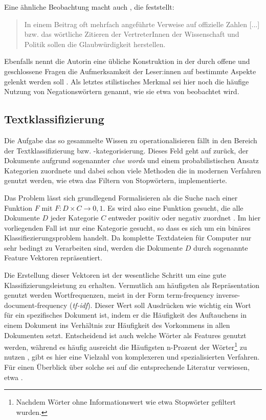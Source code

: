 Eine ähnliche Beobachtung macht auch \textcite{filatkina_2018}, die feststellt:

\begin{quotation}
    In einem Beitrag oft mehrfach angeführte Verweise auf offizielle Zahlen [...] bzw. das wörtliche Zitieren der VertreterInnen der Wissenschaft und Politik sollen die Glaubwürdigkeit herstellen. \parencite[][208]{filatkina_2018}
\end{quotation}

Ebenfalls nennt die Autorin eine übliche Konstruktion in der durch offene und geschlossene Fragen die Aufmerksamkeit der Leser:innen auf bestimmte Aspekte gelenkt werden soll \parencite[][205]{filatkina_2018}.
Als letztes stilistisches Merkmal sei hier noch die häufige Nutzung von Negationswörtern genannt, wie sie etwa von \textcite[149]{stumpf_2019} beobachtet wird.

\subsection{Textklassifizierung}

Die Aufgabe das so gesammelte Wissen zu operationalisieren fällt in den Bereich der Textklassifizierung bzw. -kategorisierung.
Dieses Feld geht auf \textcite{maron_1961} zurück, der Dokumente aufgrund sogenannter \textit{clue words} und einem probabilistischen Ansatz Kategorien zuordnete und dabei schon viele Methoden die in modernen Verfahren genutzt werden, wie etwa das Filtern von Stopwörtern, implementierte.

Das Problem lässt sich grundlegend Formalisieren als die Suche nach einer Funktion $F$ mit $F : D \times C \rightarrow {0, 1}$.
Es wird also eine Funktion gesucht, die alle Dokumente $D$ jeder Kategorie $C$ entweder positiv oder negativ zuordnet \parencite[vgl.][66f]{feldman_sanger_2006}.
Im hier vorliegenden Fall ist nur eine Kategorie gesucht, so dass es sich um ein binäres Klassifiezierungsproblem handelt.
Da komplette Textdateien für Computer nur sehr bedingt zu Verarbeiten sind, werden die Dokumente $D$ durch sogenannte Feature Vektoren repräsentiert.

Die Erstellung dieser Vektoren ist der wesentliche Schritt um eine gute Klassifizierungsleistung zu erhalten.
Vermutlich am häufigsten als Repräsentation genutzt werden Wortfrequenzen, meist in der Form term-frequency inverse-document-frequency (\textit{tf-idf}).
Dieser Wert soll Ausdrücken wie wichtig ein Wort für ein spezifisches Dokument ist, indem er die Häufigkeit des Auftauchens in einem Dokument ins Verhältnis zur Häufigkeit des Vorkommens in allen Dokumenten setzt.
Entscheidend ist auch welche Wörter als Features genutzt werden, während es häufig ausreicht die Häufigsten n-Prozent der Wörter\footnote{Nachdem Wörter ohne Informationswert wie etwa Stopwörter gefiltert wurden.} zu nutzen \parencite[][68]{feldman_sanger_2006}, gibt es hier eine Vielzahl von komplexeren und spezialisierten Verfahren.
Für einen Überblick über solche sei auf die entsprechende Literatur verwiesen, etwa \textcite{yang_1997}.

